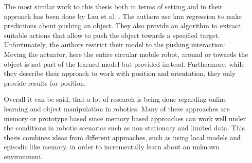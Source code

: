 The most similar work to this thesis both in terms of setting and in their approach has been done by 
Lau et al. \cite{pushing}. The authors use \gls{knn} regression to make predictions about pushing an object. They also provide an algorithm to extract suitable actions that allow to push the object towards a specified target. Unfortunately, the authors restrict their model to the pushing interaction: Moving the actuator, here the entire circular mobile robot, around or towards the object is not part of the learned model but provided instead. Furthermore, while they describe their approach to work with position and orientation, they only provide results for position. 

Overall it can be said, that a lot of research is being done regarding online learning and object manipulation in robotics. Many of these approaches are memory or prototype based since memory based approaches can work well under the conditions in robotic scenarios such as non stationary and limited data. 
This thesis combines ideas from different approaches, such as using local models and episodic like memory, in order to incrementally learn about an unknown environment.

